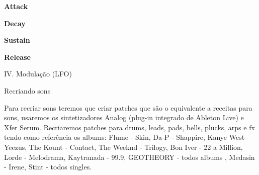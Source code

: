 \documentclass[12pt]{article}
\begin{document}
\begin{flushleft}
    \large\bf{Attack}
\end{flushleft}

\begin{flushleft}
    \large\bf{Decay}
\end{flushleft}

\begin{flushleft}
    \large\bf{Sustain}
\end{flushleft}

\begin{flushleft}
    \large\bf{Release}
\end{flushleft}

\pagebreak

\begin{flushleft}
    \Large{IV. Modula\c c\~ao (LFO)}
\end{flushleft}

\pagebreak

\begin{center}
    \Huge{Recriando sons}
\end{center}

\justifying
Para recriar sons teremos que criar patches que s\~ao o equivalente a receitas
para sons, usaremos os sintetizadores Analog (plug-in integrado de Ableton
Live) e Xfer Serum. Recriaremos patches para drums, leads, pads, bells, plucks,
arps e fx tendo como refer\^encia os albums: Flume - Skin, Da-P - Shappire, Kanye West -
Yeezus, The Kount - Contact, The Weeknd - Trilogy, Bon Iver - 22 a Million,
Lorde - Melodrama, Kaytranada - 99.9, GEOTHEORY - todos albums , Medasin -
Irene, Stint - todos singles.   
\end{document}
